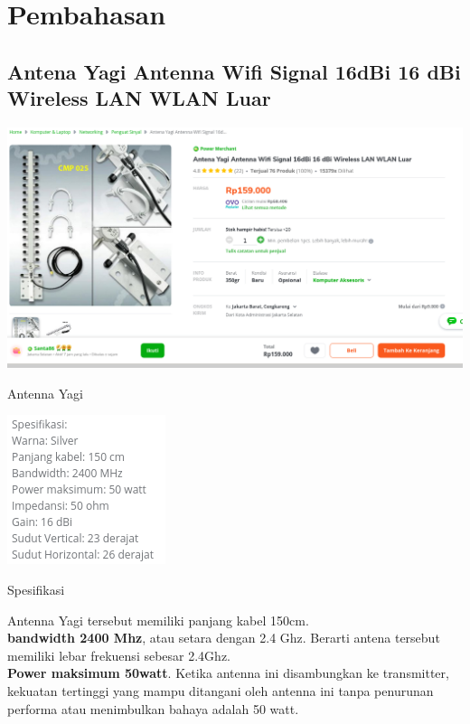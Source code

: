 \documentclass[a4paper,12pt]{article}
\begin{document}
\section{Pembahasan}
\subsection{Antena Yagi Antenna Wifi Signal 16dBi 16 dBi Wireless LAN WLAN Luar}
\begin{minipage}{\linewidth}
    \centering
    \includegraphics[scale=.3]{1a.png}
    \label{fig:antena_yagi}
    \caption{Antenna Yagi}
\end{minipage}
\begin{minipage}[!hbt]{\linewidth}
    \centering
    \includegraphics[scale=1]{1b.png}\\
    \label{fig:spesifikasi_yagi}
    \caption{Spesifikasi}
\end{minipage}
\newpage
Antenna Yagi tersebut memiliki panjang kabel 150cm.\\

\textbf{bandwidth 2400 Mhz}, atau setara dengan 2.4 Ghz. Berarti antena tersebut memiliki lebar frekuensi sebesar 2.4Ghz.\\

\textbf{Power maksimum 50watt}. Ketika antenna ini disambungkan ke transmitter, kekuatan tertinggi yang mampu ditangani oleh antenna ini tanpa
penurunan performa atau menimbulkan bahaya adalah 50 watt.\\
\end{document}
